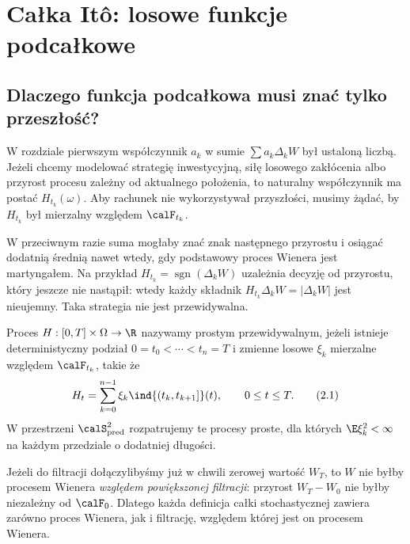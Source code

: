 \chapter{Całka Itô: losowe funkcje podcałkowe}
\label{ch:ito-construction}
\section{Dlaczego funkcja podcałkowa musi znać tylko przeszłość?}
W rozdziale pierwszym współczynnik $a_k$ w sumie
$\sum a_k\Delta_kW$ był ustaloną liczbą. Jeżeli chcemy
modelować strategię inwestycyjną, siłę losowego zakłócenia
albo przyrost procesu zależny od aktualnego położenia,
to naturalny współczynnik ma postać $H_{t_k}(\omega)$.
Aby rachunek nie wykorzystywał przyszłości, musimy żądać,
by $H_{t_k}$ był mierzalny względem $\calF_{t_k}$.

W przeciwnym razie suma mogłaby znać znak następnego
przyrostu i osiągać dodatnią średnią nawet wtedy, gdy
podstawowy proces Wienera jest martyngałem. Na przykład
$H_{t_k}=\operatorname{sgn}(\Delta_kW)$
uzależnia decyzję od przyrostu, który jeszcze nie nastąpił:
wtedy każdy składnik $H_{t_k}\Delta_kW=|\Delta_kW|$
jest nieujemny. Taka strategia nie jest przewidywalna.

\begin{definicja}
Proces $H:[0,T]\times\Omega\to\R$ nazywamy prostym
przewidywalnym, jeżeli istnieje deterministyczny podział
$0=t_0<\cdots<t_n=T$ i zmienne losowe $\xi_k$
mierzalne względem $\calF_{t_k}$, takie że
\[
H_t=\sum_{k=0}^{n-1}\xi_k\ind{(t_k,t_{k+1}]}(t),
\qquad 0\le t\le T.
\tag{2.1}\label{eq:ito-step}
\]
W przestrzeni $\calS_{\mathrm{pred}}^2$ rozpatrujemy
te procesy proste, dla których $\E\xi_k^2<\infty$
na każdym przedziale o dodatniej długości.
\end{definicja}

\begin{uwaga}
Jeżeli do filtracji dołączylibyśmy już w chwili zerowej
wartość $W_T$, to $W$ nie byłby procesem Wienera
\emph{względem powiększonej filtracji}: przyrost
$W_T-W_0$ nie byłby niezależny od $\calF_0$.
Dlatego każda definicja całki stochastycznej zawiera
zarówno proces Wienera, jak i filtrację, względem której
jest on procesem Wienera.
\end{uwaga}

